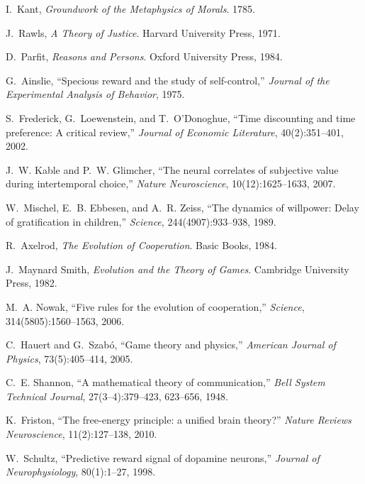 \documentclass[11pt,a4paper]{article}
\begin{document}
\begin{thebibliography}{99}

I.~Kant, \emph{Groundwork of the Metaphysics of Morals}. 1785.

J.~Rawls, \emph{A Theory of Justice}. Harvard University Press, 1971.

D.~Parfit, \emph{Reasons and Persons}. Oxford University Press, 1984.

G.~Ainslie, ``Specious reward and the study of self-control,'' \emph{Journal of the Experimental Analysis of Behavior}, 1975.

S.~Frederick, G.~Loewenstein, and T.~O’Donoghue, ``Time discounting and time preference: A critical review,'' \emph{Journal of Economic Literature}, 40(2):351--401, 2002.

J.~W. Kable and P.~W. Glimcher, ``The neural correlates of subjective value during intertemporal choice,'' \emph{Nature Neuroscience}, 10(12):1625--1633, 2007.

W.~Mischel, E.~B. Ebbesen, and A.~R. Zeiss, ``The dynamics of willpower: Delay of gratification in children,'' \emph{Science}, 244(4907):933--938, 1989.

R.~Axelrod, \emph{The Evolution of Cooperation}. Basic Books, 1984.

J.~Maynard Smith, \emph{Evolution and the Theory of Games}. Cambridge University Press, 1982.

M.~A. Nowak, ``Five rules for the evolution of cooperation,'' \emph{Science}, 314(5805):1560--1563, 2006.

C.~Hauert and G.~Szab{\'o}, ``Game theory and physics,'' \emph{American Journal of Physics}, 73(5):405--414, 2005.

C.~E. Shannon, ``A mathematical theory of communication,'' \emph{Bell System Technical Journal}, 27(3--4):379--423, 623--656, 1948.

K.~Friston, ``The free-energy principle: a unified brain theory?'' \emph{Nature Reviews Neuroscience}, 11(2):127--138, 2010.

W.~Schultz, ``Predictive reward signal of dopamine neurons,'' \emph{Journal of Neurophysiology}, 80(1):1--27, 1998.


\end{thebibliography}
\end{document}

